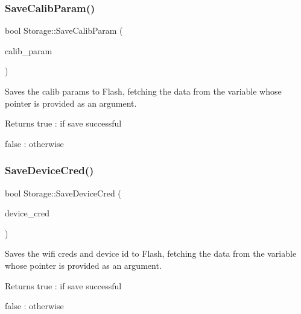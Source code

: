 \subsubsection{\texorpdfstring{Save\+Calib\+Param()}{SaveCalibParam()}}
{\footnotesize\ttfamily bool Storage\+::\+Save\+Calib\+Param (\begin{DoxyParamCaption}\item[{const \hyperlink{structCONFIG__SET_1_1CALIB__PARAMS}{C\+O\+N\+F\+I\+G\+\_\+\+S\+E\+T\+::\+C\+A\+L\+I\+B\+\_\+\+P\+A\+R\+A\+MS} $\ast$}]{calib\+\_\+param }\end{DoxyParamCaption})}



Saves the calib params to Flash, fetching the data from the variable whose pointer is provided as an argument. 

\begin{DoxyReturn}{Returns}
true \+: if save successful 

false \+: otherwise 
\end{DoxyReturn}
\mbox{\label{classStorage_a6a1b8fc3b64a382e6b81228a40057677}} 
\subsubsection{\texorpdfstring{Save\+Device\+Cred()}{SaveDeviceCred()}}
{\footnotesize\ttfamily bool Storage\+::\+Save\+Device\+Cred (\begin{DoxyParamCaption}\item[{const \hyperlink{structCONFIG__SET_1_1DEVICE__CRED}{C\+O\+N\+F\+I\+G\+\_\+\+S\+E\+T\+::\+D\+E\+V\+I\+C\+E\+\_\+\+C\+R\+ED} $\ast$}]{device\+\_\+cred }\end{DoxyParamCaption})}



Saves the wifi creds and device id to Flash, fetching the data from the variable whose pointer is provided as an argument. 

\begin{DoxyReturn}{Returns}
true \+: if save successful 

false \+: otherwise 
\end{DoxyReturn}
\mbox{\label{classStorage_ab7c03d2d026178e06e72507f643fcf4a}} 
